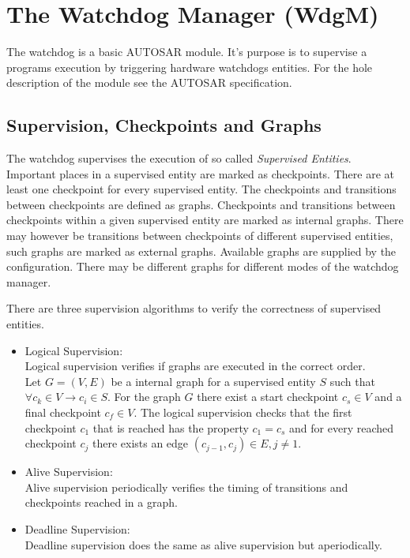 \chapter{The Watchdog Manager (WdgM)}
\label{APPENDIX:WDGM}
The watchdog is a basic AUTOSAR module. It's purpose is to supervise a programs
execution by triggering hardware watchdogs entities. For the hole description of
the module see the AUTOSAR specification.

\section{Supervision, Checkpoints and Graphs}
The watchdog supervises the execution of so called \emph{Supervised Entities}.
Important places in a supervised entity are marked as checkpoints. There are at
least one checkpoint for every supervised entity. The checkpoints and
transitions between checkpoints are defined as graphs. Checkpoints and
transitions between checkpoints within a given supervised entity are marked as
internal graphs. There may however be transitions between checkpoints of
different supervised entities, such graphs are marked as external graphs.
Available graphs are supplied by the configuration. There may be different
graphs for different modes of the watchdog manager.

There are three supervision algorithms to verify the correctness of supervised
entities.
\begin{itemize}
\item Logical Supervision: \\
Logical supervision verifies if graphs are executed in the correct order. \\ Let
$G = (V,E)$ be a internal graph for a supervised entity $S$ such that $\forall c_k
\in V \rightarrow c_i \in S$. For the graph $G$ there exist a start checkpoint
$c_s \in V$ and a final checkpoint $c_f \in V$. The logical supervision
checks that the first checkpoint $c_1$ that is reached has the property $c_1 =
c_s$ and for every reached checkpoint $c_j$ there exists an edge
$(c_{j-1},c_{j}) \in E, j \neq 1$.
\item Alive Supervision: \\
  Alive supervision periodically verifies the timing of transitions and
checkpoints reached in a graph.
\item Deadline Supervision: \\
  Deadline supervision does the same as alive supervision but aperiodically.
\end{itemize}

